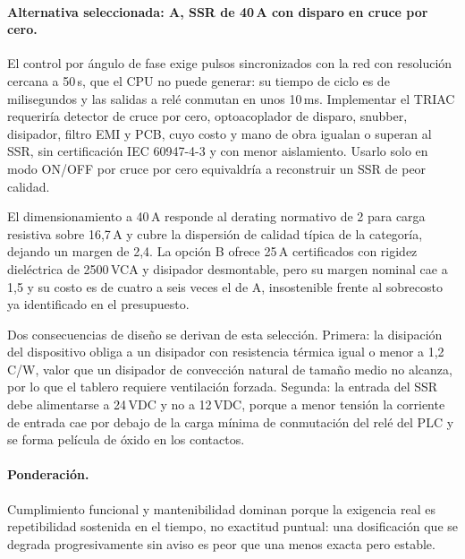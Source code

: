 \paragraph{Alternativa seleccionada: A, SSR de 40\,A con disparo en cruce por cero.} El control por ángulo de fase exige pulsos sincronizados con la red con resolución cercana a 50\,\textmu s, que el CPU no puede generar: su tiempo de ciclo es de milisegundos y las salidas a relé conmutan en unos 10\,ms. Implementar el TRIAC requeriría detector de cruce por cero, optoacoplador de disparo, snubber, disipador, filtro EMI y PCB, cuyo costo y mano de obra igualan o superan al SSR, sin certificación IEC 60947-4-3 y con menor aislamiento. Usarlo solo en modo ON/OFF por cruce por cero equivaldría a reconstruir un SSR de peor calidad.

El dimensionamiento a 40\,A responde al derating normativo de 2\texttimes{} para carga resistiva sobre 16,7\,A y cubre la dispersión de calidad típica de la categoría, dejando un margen de 2,4\texttimes. La opción B ofrece 25\,A certificados con rigidez dieléctrica de 2500\,VCA y disipador desmontable, pero su margen nominal cae a 1,5\texttimes{} y su costo es de cuatro a seis veces el de A, insostenible frente al sobrecosto ya identificado en el presupuesto.

Dos consecuencias de diseño se derivan de esta selección. Primera: la disipación del dispositivo obliga a un disipador con resistencia térmica igual o menor a 1,2\,\textdegree C/W, valor que un disipador de convección natural de tamaño medio no alcanza, por lo que el tablero requiere ventilación forzada. Segunda: la entrada del SSR debe alimentarse a 24\,VDC y no a 12\,VDC, porque a menor tensión la corriente de entrada cae por debajo de la carga mínima de conmutación del relé del PLC y se forma película de óxido en los contactos.



\paragraph{Ponderación.} Cumplimiento funcional y mantenibilidad dominan porque la exigencia real es repetibilidad sostenida en el tiempo, no exactitud puntual: una dosificación que se degrada progresivamente sin aviso es peor que una menos exacta pero estable.

